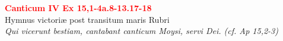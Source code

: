 


\def\greinitialformat#1{%
{\fontsize{39}{39}\selectfont #1}%
}




\vspace{0.3cm}
\begin{center}
 \textcolor{red}{\large \bf Canticum IV Ex 15,1-4a.8-13.17-18}\\
Hymnus victoriæ post transitum maris Rubri\\
\textit{\small Qui vicerunt bestiam, cantabant canticum Moysi, servi Dei. (cf. Ap 15,2-3)}
\end{center}
